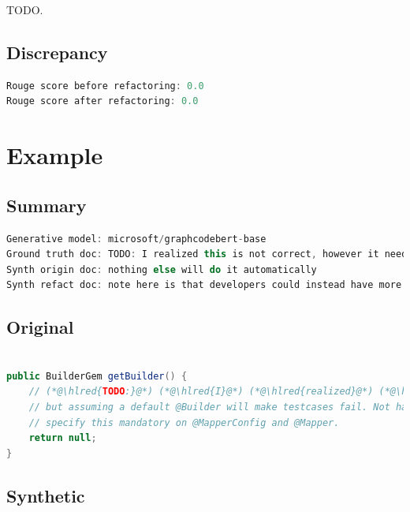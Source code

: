 \documentclass[usenames,dvipsnames]{article} %
\DeclareRobustCommand{\hlred}[1]{{\sethlcolor{pink}\hl{#1}}}
\begin{document}
  TODO.

  \subsection{Discrepancy}

  \begin{lstlisting}[language=java]
Rouge score before refactoring: 0.0
Rouge score after refactoring: 0.0
  \end{lstlisting}



  \pagebreak
  \section{Example}
  \subsection{Summary}

  \begin{lstlisting}[language=java]
Generative model: microsoft/graphcodebert-base
Ground truth doc: TODO: I realized this is not correct, however it needs to be null in order to keep downward compatibility
Synth origin doc: nothing else will do it automatically
Synth refact doc: note here is that developers could instead have more information that should not need builder information and should also
  \end{lstlisting}

  \subsection{Original}
  \begin{lstlisting}[language=java]

public BuilderGem getBuilder() {
    // (*@\hlred{TODO:}@*) (*@\hlred{I}@*) (*@\hlred{realized}@*) (*@\hlred{this}@*) (*@\hlred{is not correct, however }@*)it (*@\hlred{needs to be null in order to keep downward compatibility}@*)
    // but assuming a default @Builder will make testcases fail. Not having a default means that you need to
    // specify this mandatory on @MapperConfig and @Mapper.
    return null;
}
  \end{lstlisting}
  \subsection{Synthetic}
\end{document}
